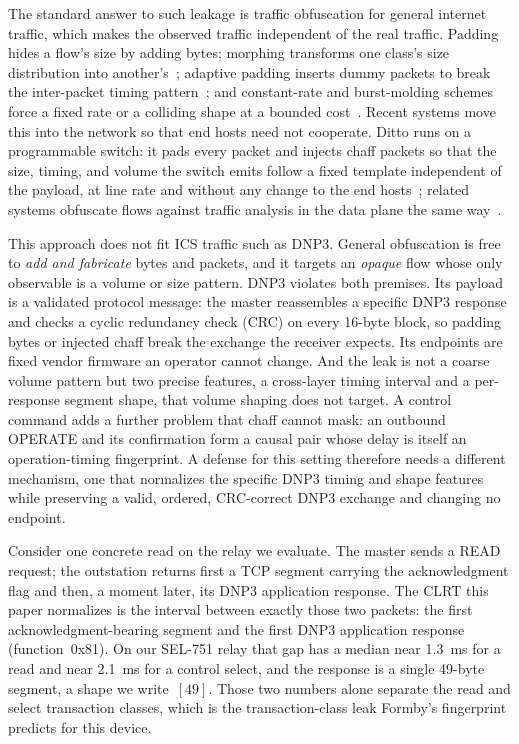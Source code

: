The standard answer to such leakage is traffic obfuscation for general internet traffic, which makes
the observed traffic independent of the real traffic. Padding hides a flow's size by adding bytes;
morphing transforms one class's size distribution into another's~\cite{wright2009}; adaptive padding
inserts dummy packets to break the inter-packet timing pattern~\cite{juarez2016}; and constant-rate
and burst-molding schemes force a fixed rate or a colliding shape at a bounded
cost~\cite{tamaraw2014,walkietalkie2017}. Recent systems move this into the network so that end hosts
need not cooperate. Ditto runs on a programmable switch: it pads
every packet and injects chaff packets so that the size, timing, and volume the switch emits follow a
fixed template independent of the payload, at line rate and without any change to the end
hosts~\cite{ditto2022}; related systems obfuscate flows against traffic analysis in the data plane the
same way~\cite{securitas2026,minos2025,nethide2018}.

This approach does not fit ICS traffic such as DNP3. General obfuscation is free to \emph{add and
fabricate} bytes and packets, and it targets an \emph{opaque} flow whose only observable is a volume or
size pattern. DNP3 violates both
premises. Its payload is a validated protocol message: the master reassembles a specific DNP3 response
and checks a cyclic redundancy check (CRC) on every 16-byte block, so padding bytes or injected chaff
break the exchange the receiver expects. Its endpoints are fixed vendor firmware an operator cannot
change. And the leak is not a coarse volume pattern but two precise features, a cross-layer timing
interval and a per-response segment shape, that volume shaping does not target. A control command adds
a further problem that chaff cannot mask: an outbound OPERATE and its confirmation form a causal pair
whose delay is itself an operation-timing fingerprint. A defense for this setting therefore needs a
different mechanism, one that normalizes the specific DNP3 timing and shape features while preserving a
valid, ordered, CRC-correct DNP3 exchange and changing no endpoint.

Consider one concrete read on the relay we evaluate. The master sends a READ request; the outstation
returns first a TCP segment carrying the acknowledgment flag and then, a moment later, its DNP3
application response. The CLRT this paper normalizes is the interval between exactly those two
packets: the first acknowledgment-bearing segment and the first DNP3 application response
(function~0x81). On our SEL-751 relay that gap has a median near 1.3~ms for a read and near 2.1~ms for
a control select, and the response is a single 49-byte segment, a shape we write~$[49]$. Those two
numbers alone separate the read and select transaction classes, which is the transaction-class leak
Formby's fingerprint predicts for this device.

